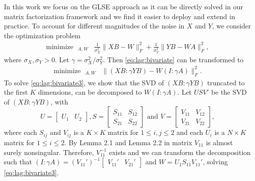 \documentclass[preprint]{imsart}
\numberwithin{equation}{section}
\theoremstyle{plain}
\DeclareMathOperator*{\rank}{rank}
\DeclareMathOperator*{\minimize}{minimize\ \ }
\DeclareMathOperator*{\subjectto}{subject\ to\ \ }
\begin{document}
In this work we focus on the GLSE approach as it can be directly solved in our matrix factorization framework and we find it easier to deploy and extend in practice. %
To account for different magnitudes of the noise in $X$ and $Y$, we consider the optimization problem
\begin{align}\label{eq:lag:bivariate}
  \minimize_{A,W} & \frac{1}{\sigma_X^2}\|XB - W \|_F^2 + \frac{1}{\sigma_Y^2} \| YB - WA \|_F^2,
\end{align}
where $\sigma_X,\sigma_Y > 0$. Let $\gamma = \sigma_X^2 / \sigma_Y^2$. Then \eqref{eq:lag:bivariate} can be transformed to
\begin{align}\label{eq:lag:bivariate3}
  \minimize_{A,W} & \| (XB : \gamma YB) - W(I: \gamma A) \|_F^2.%
\end{align}
To solve \eqref{eq:lag:bivariate3}, we show that the SVD of $(XB : \gamma YB)$ truncated to the first $K$ dimensions, can be decomposed to $W(I: \gamma A)$. Let $USV'$ be the SVD of $(XB : \gamma YB)$, with
\[
U = \begin{bmatrix}
  U_1 & U_2
\end{bmatrix},
S = \begin{bmatrix}
      S_{11} & S_{12}\\
      S_{21} & S_{22}
\end{bmatrix} 
\text{ and }
V = \begin{bmatrix}
      V_{11} & V_{12}\\
      V_{21} & V_{22}
    \end{bmatrix},
\]
where each $S_{ij}$ and $V_{ij}$ is a $K\times K$ matrix for $1 \leq i,j \leq 2$ and each $U_i$ is a $N \times K$ matrix for $1 \leq i \leq 2$. By Lemma 2.1 and Lemma 2.2 in \citep{gleser1981estimation} matrix $V_{11}$ is almost surely nonsingular. Therefore, $V_{11}^{-1}$ exists and we can transform the decomposition such that $(I : \gamma A) = (V_{11}')^{-1}\begin{bmatrix}V_{11}' & V_{21}'\end{bmatrix}$ and $W = U_1 S_{11} V_{11}'$, solving \eqref{eq:lag:bivariate3}.
\end{document}
